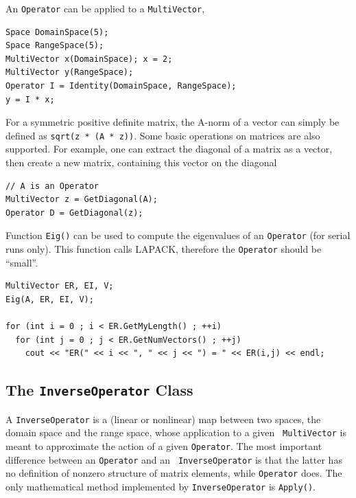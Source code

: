 \documentclass{article}[11pt]
\begin{document}
\smallskip

An {\tt Operator} can be applied to a {\tt MultiVector},
\begin{verbatim}
Space DomainSpace(5);
Space RangeSpace(5);
MultiVector x(DomainSpace); x = 2;
MultiVector y(RangeSpace);
Operator I = Identity(DomainSpace, RangeSpace);
y = I * x;
\end{verbatim}

\smallskip

For a symmetric positive definite matrix, the A-norm of a vector can simply be
defined as \verb!sqrt(z * (A * z))!.
Some basic operations on matrices are also supported. For example,
one can extract the diagonal of a matrix as a vector, then create a new
matrix, containing this vector on the diagonal
\begin{verbatim}    
// A is an Operator
MultiVector z = GetDiagonal(A);
Operator D = GetDiagonal(z);
\end{verbatim}

Function {\tt Eig()} can be used to compute the eigenvalues of an
{\tt Operator}
(for serial runs only). This function calls LAPACK, therefore the
{\tt Operator} should be ``small''.
\begin{verbatim}    
MultiVector ER, EI, V;
Eig(A, ER, EI, V);

for (int i = 0 ; i < ER.GetMyLength() ; ++i)
  for (int j = 0 ; j < ER.GetNumVectors() ; ++j)
    cout << "ER(" << i << ", " << j << ") = " << ER(i,j) << endl;
\end{verbatim}

\subsection{The {\tt InverseOperator} Class}
\label{sec:inverseoperator}

A {\tt InverseOperator} is a (linear or nonlinear) map between two spaces, the
domain space and the range space, whose application to a given {\tt
  MultiVector} is meant to approximate the action of a given {\tt Operator}.
The most important difference between an {\tt Operator} and an {\tt
  InverseOperator} is that the latter has no definition of nonzero
  structure of matrix elements, while {\tt Operator} does. The only mathematical method implemented
  by {\tt InverseOperator} is {\tt Apply()}.
\end{document}
